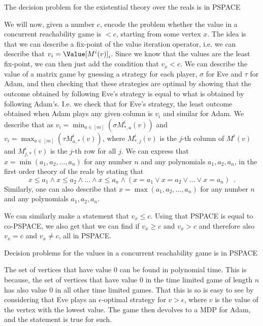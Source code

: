 \begin{lemma}
The decision problem for the existential theory over the reals is in PSPACE
\end{lemma} 

We will now, given a number $c$, encode the problem whether the value in a concurrent reachability game is  $<c$, starting from some vertex $x$.
The idea is that we can describe a fix-point of the value iteration operator, i.e.
we can describe that $v_i=\Value[M^i(v)]_i$. Since we know that the values are the least fix-point, we can then just add the condition that $v_x<c$. 
We can describe the value of a matrix game by guessing a strategy for each player, $\sigma$ for Eve and $\tau$ for Adam, and then checking that these strategies are optimal by showing that the outcome obtained by following Eve's strategy is equal to what is obtained by following Adam's.
I.e. we check that for Eve's strategy, the least outcome obtained when Adam plays any given column is $v_i$ and similar for Adam.
We describe that as $v_i=\min_{a\in [m]} (\sigma M^i_{*,a}(v))$ and $v_i=\max_{a\in [m]} (\tau M^i_{a,*}(v))$, where $M^i_{*,j}(v)$ is the $j$-th column of $M^i(v)$ and $M^i_{j,*}(v)$ is the $j$-th row for all $j$. 
We can express that $x=\min(a_1,a_2,\dots,a_n)$ for any number $n$ and any polynomials $a_1,a_2,a_n$, in the first order theory of the reals by stating that \[
x\leq a_1\wedge x\leq a_2\wedge \dots \wedge x\leq a_n \wedge (x=a_1\vee x=a_2\vee \dots \vee x=a_n) \enspace .\]
Similarly, one can also describe that $x=\max(a_1,a_2,\dots,a_n)$ for any number $n$ and any polynomials $a_1,a_2,a_n$.

We can similarly make a statement that $v_x\leq c$. Using that PSPACE is equal to co-PSPACE, we also get that we can find if $v_x\geq c$ and $v_x>c$ and therefore also $v_x=c$ and $v_x\neq c$, all in PSPACE.

\begin{lemma}
Decision problems for the values in a concurrent reachability game is in PSPACE
\end{lemma}

The set of vertices that have value 0 can be found in polynomial time. This is because, the set of vertices that have value 0 in the time limited game of length $n$ has also value 0 in all other time limited games. That this is so is easy to see by considering that Eve plays an $\epsilon$-optimal strategy for $v>\epsilon$, where $v$ is the value of the vertex with the lowest value. The game then devolves to a MDP for Adam, and the statement is true for such.

